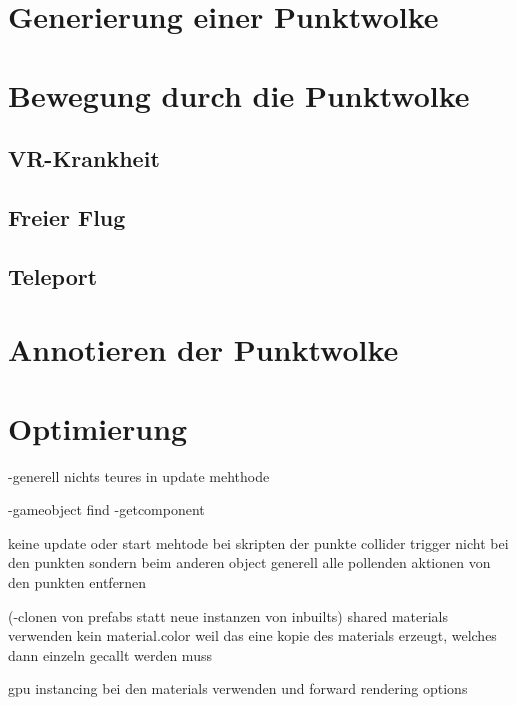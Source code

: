 
\section{Generierung einer Punktwolke}

\section{Bewegung durch die Punktwolke}

\subsection{VR-Krankheit}

\subsection{Freier Flug}

\subsection{Teleport}

\section{Annotieren der Punktwolke}

\section{Optimierung}
-generell nichts teures in update mehthode
	
-gameobject find
-getcomponent

keine update oder start mehtode bei skripten der punkte
collider trigger nicht bei den punkten sondern beim anderen object
generell alle pollenden aktionen von den punkten entfernen


(-clonen von prefabs statt neue instanzen von inbuilts)
shared materials verwenden   kein material.color weil das eine kopie des materials erzeugt, welches dann einzeln gecallt werden muss

gpu instancing bei den materials verwenden und forward rendering options

